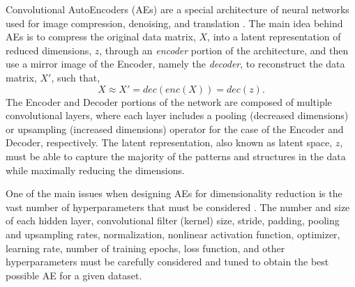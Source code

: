 \documentclass[a4paper,fleqn,12pt]{article}
\begin{document}
Convolutional AutoEncoders (AEs) are a special architecture of neural networks used for image compression, denoising, and translation \cite{jiang2021convolutional, liu2017unsupervised}. The main idea behind AEs is to compress the original data matrix, $X$, into a latent representation of reduced dimensions, $z$, through an \emph{encoder} portion of the architecture, and then use a mirror image of the Encoder, namely the \emph{decoder}, to reconstruct the data matrix, $X'$, such that,
\begin{equation}
    X \approx X' = dec(enc(X)) = dec(z) .
\end{equation}
The Encoder and Decoder portions of the network are composed of multiple convolutional layers, where each layer includes a pooling (decreased dimensions) or upsampling (increased dimensions) operator for the case of the Encoder and Decoder, respectively. The latent representation, also known as latent space, $z$, must be able to capture the majority of the patterns and structures in the data while maximally reducing the dimensions. 

One of the main issues when designing AEs for dimensionality reduction is the vast number of hyperparameters that must be considered \cite{hutter2015beyond}. The number and size of each hidden layer, convolutional filter (kernel) size, stride, padding, pooling and upsampling rates, normalization, nonlinear activation function, optimizer, learning rate, number of training epochs, loss function, and other hyperparameters must be carefully considered and tuned to obtain the best possible AE for a given dataset. 

\end{document}
